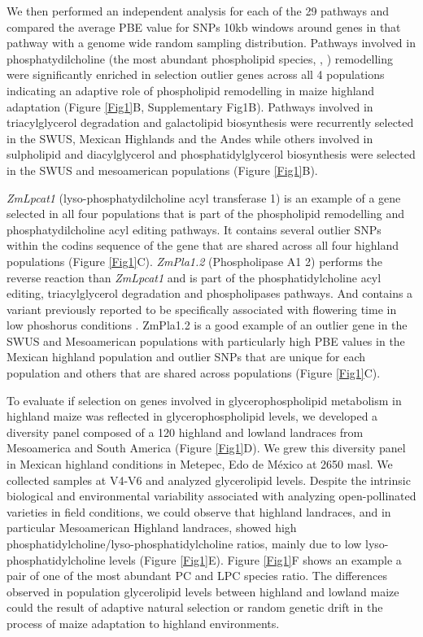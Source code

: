 \documentclass[9pt,twocolumn,twoside,lineno]{gsajnl}
\begin{document}
We then performed an independent analysis for each of the 29 pathways and compared the average PBE value for SNPs 10kb windows around genes in that pathway with a genome wide random sampling distribution. Pathways involved in phosphatydilcholine (the most abundant phospholipid species\citep{Gu2017-nd}, \citep{Poincelot1976-qe}, \citep{Hawke1974-ab}) remodelling were significantly enriched in selection outlier genes across all 4 populations indicating an adaptive role of phospholipid remodelling in maize highland adaptation (Figure \ref{Fig1}B, Supplementary Fig1B).
Pathways involved in triacylglycerol degradation and galactolipid biosynthesis were recurrently selected in the SWUS, Mexican Highlands and the Andes while others involved in sulpholipid and diacylglycerol and phosphatidylglycerol biosynthesis were selected in the SWUS and mesoamerican populations (Figure \ref{Fig1}B).  

\textit{ZmLpcat1} (lyso-phosphatydilcholine acyl transferase 1) is an example of a gene selected in all four populations that is part of the phospholipid remodelling and phosphatydilcholine acyl editing pathways. 
It contains several outlier SNPs within the codins sequence of the gene that are shared across all four highland populations (Figure \ref{Fig1}C). \textit{ZmPla1.2} (Phospholipase A1 2) performs the reverse reaction than \textit{ZmLpcat1} and is part of the phosphatidylcholine acyl editing, triacylglycerol degradation and phospholipases pathways. And contains a variant previously reported to be specifically associated with flowering time in low phoshorus conditions \cite{xu2018a}. 
ZmPla1.2 is a good example of an outlier gene in the SWUS and Mesoamerican populations with particularly high PBE values in the Mexican highland population and outlier SNPs that are unique for each population and others that are shared across populations (Figure \ref{Fig1}C).

To evaluate if selection on genes involved in glycerophospholipid metabolism in highland maize was reflected in glycerophospholipid levels, we developed a diversity panel composed of a 120 highland and lowland landraces from Mesoamerica and South America (Figure \ref{Fig1}D). 
We grew this diversity panel in Mexican highland conditions in Metepec, Edo de México at 2650 masl.
We collected samples at V4-V6 and analyzed glycerolipid levels. 
Despite the intrinsic biological and environmental variability associated with analyzing open-pollinated varieties in field conditions, we could observe that highland landraces, and in particular Mesoamerican Highland landraces, showed  high phosphatidylcholine/lyso-phosphatidylcholine ratios, mainly due to low lyso-phosphatidylcholine levels (Figure \ref{Fig1}E). 
Figure \ref{Fig1}F shows an example a pair of one of the most abundant PC and LPC species ratio. 
The differences observed in population glycerolipid levels between highland and lowland maize could the result of adaptive natural selection or random genetic drift in the process of maize adaptation to highland environments.
\end{document}
